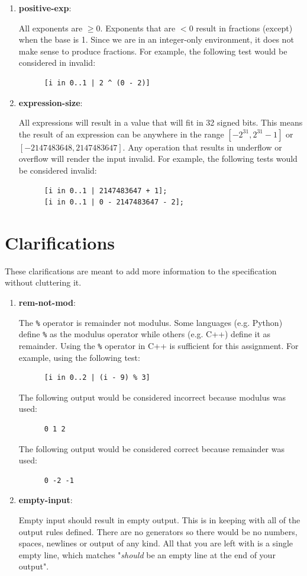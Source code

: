 \documentclass{article}
\newcommand{\code}[1]{\texttt{\textmd{#1}}}
\newcommand{\assertiondest}[1]{\hypertarget{#1}{\textbf{#1}:}}
\newcommand{\clarificationdest}[1]{\hypertarget{#1}{\textbf{#1}:}}
\begin{document}
\begin{enumerate}
    would be considered invalid:
    \begin{lstlisting}
      [i in 0..1 | -1];
      [i in 0..1 | 2147483648];
      [i in 0..2147483648 | 0];
      [i in -1..1 | 0];
    \end{lstlisting}
  \item
    \assertiondest{positive-exp}
    All exponents are $\geq 0$. Exponents that are $< 0$ result in fractions (except) when the
    base is 1. Since we are in an integer-only environment, it does not make sense to produce
    fractions. For example, the following test would be considered in invalid:
    \begin{lstlisting}
      [i in 0..1 | 2 ^ (0 - 2)]
    \end{lstlisting}
  \item
    \assertiondest{expression-size}
    All expressions will result in a value that will fit in 32 signed bits. This means the result
    of an expression can be anywhere in the range $[-2^{31}, 2^{31} - 1]$ or $[-2147483648,
    2147483647]$. Any operation that results in underflow or overflow will render the input
    invalid. For example, the following tests would be considered invalid:
    \begin{lstlisting}
      [i in 0..1 | 2147483647 + 1];
      [i in 0..1 | 0 - 2147483647 - 2];
    \end{lstlisting}
\end{enumerate}

\section{Clarifications}
These clarifications are meant to add more information to the specification without cluttering it.
\begin{enumerate}
  \item
    \clarificationdest{rem-not-mod}
    The \code{\%} operator is remainder not modulus. Some languages (e.g. Python) define \code{\%}
    as the modulus operator while others (e.g. C++) define it as remainder. Using the \code{\%}
    operator in C++ is sufficient for this assignment. For example, using the
    following test:
    \begin{lstlisting}
      [i in 0..2 | (i - 9) % 3]
    \end{lstlisting}
    The following output would be considered incorrect because modulus was used:
    \begin{lstlisting}
      0 1 2
    \end{lstlisting}
    The following output would be considered correct because remainder was used:
    \begin{lstlisting}
      0 -2 -1
    \end{lstlisting}
  \item
    \clarificationdest{empty-input}
    Empty input should result in empty output. This is in keeping with all of the output rules
    defined. There are no generators so there would be no numbers, spaces, newlines or output of
    any kind. All that you are left with is a single empty line, which matches "\textit{should} be
    an empty line at the end of your output".

\end{enumerate}
\end{document}
